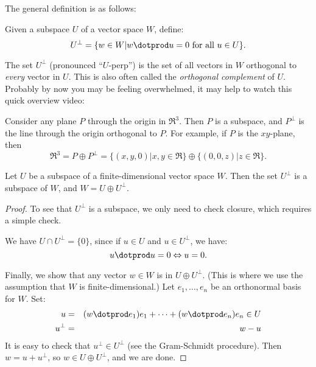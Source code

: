 The general definition is as follows:
\begin{definition}
Given a subspace $U$ of a vector space $W$, define:
\[
U^\perp = \{w\in W | w\dotprod u=0 \text{ for all } u\in U\}.
\]
\end{definition}

The set $U^\perp$ (pronounced ``$U$-perp'') is the set of all vectors in $W$ orthogonal to \emph{every} vector in $U$.  This is also often called the \emph{orthogonal complement} of $U$. Probably by now you may be feeling overwhelmed, it may help to watch this quick overview video:




\begin{example}
Consider any plane $P$ through the origin in $\Re^3$.  Then $P$ is a subspace, and $P^\perp$ is the line through the origin orthogonal to $P$.  For example, if $P$ is the $xy$-plane, then
\[
\Re^3=P\oplus P^\perp=\{(x,y,0)| x,y\in \Re \} \oplus \{(0,0,z)| z\in \Re \}.
\]
\end{example}

\begin{theorem}
Let $U$ be a subspace of a finite-dimensional vector space $W$.  Then the set $U^\perp$ is a subspace of $W$, and $W=U\oplus U^\perp$.
\end{theorem}

\begin{proof}
To see that $U^\perp$ is a subspace, we only need to check closure, which requires a simple check.

We have $U\cap U^\perp=\{0\}$, since if $u\in U$ and $u\in U^\perp$, we have:
\[
u\dotprod u = 0 \Leftrightarrow u=0.
\]

Finally, we show that any vector $w\in W$ is in $U\oplus U^\perp$.  (This is where we use the assumption that $W$ is finite-dimensional.)  Let $e_1, \ldots, e_n$ be an orthonormal basis for $W$.  Set: 
\begin{eqnarray*}
u&=&(w\dotprod e_1)e_1 + \cdots + (w\dotprod e_n)e_n \in U\\
u^\perp&=& w-u
\end{eqnarray*}
It is easy to check that $u^\perp \in U^\perp$ (see the Gram-Schmidt procedure).  Then $w=u+u^\perp$, so $w\in U\oplus U^\perp$, and we are done.
\end{proof}

